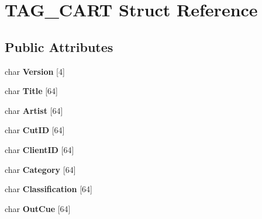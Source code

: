 \hypertarget{structTAG__CART}{}\section{T\+A\+G\+\_\+\+C\+A\+R\+T Struct Reference}
\label{structTAG__CART}
\subsection*{Public Attributes}
\begin{DoxyCompactItemize}
\item 
\hypertarget{structTAG__CART_abc7f41b25d4cac50ddb2e48866536d2b}{}char {\bfseries Version} \mbox{[}4\mbox{]}\label{structTAG__CART_abc7f41b25d4cac50ddb2e48866536d2b}

\item 
\hypertarget{structTAG__CART_aaaeb0e4ce9b4989f0b64104e49c5ba18}{}char {\bfseries Title} \mbox{[}64\mbox{]}\label{structTAG__CART_aaaeb0e4ce9b4989f0b64104e49c5ba18}

\item 
\hypertarget{structTAG__CART_af508180d2adbdc56c2b39d7b52affa05}{}char {\bfseries Artist} \mbox{[}64\mbox{]}\label{structTAG__CART_af508180d2adbdc56c2b39d7b52affa05}

\item 
\hypertarget{structTAG__CART_aad06bfb61f5147031713db4db192c8db}{}char {\bfseries Cut\+I\+D} \mbox{[}64\mbox{]}\label{structTAG__CART_aad06bfb61f5147031713db4db192c8db}

\item 
\hypertarget{structTAG__CART_aa59a44212798fcc99e1a48ebc3ce82c7}{}char {\bfseries Client\+I\+D} \mbox{[}64\mbox{]}\label{structTAG__CART_aa59a44212798fcc99e1a48ebc3ce82c7}

\item 
\hypertarget{structTAG__CART_a34408b2034c6df97558db193c5c66a7e}{}char {\bfseries Category} \mbox{[}64\mbox{]}\label{structTAG__CART_a34408b2034c6df97558db193c5c66a7e}

\item 
\hypertarget{structTAG__CART_a51d1bd046921cd0a6e8a3d4656ec55ad}{}char {\bfseries Classification} \mbox{[}64\mbox{]}\label{structTAG__CART_a51d1bd046921cd0a6e8a3d4656ec55ad}

\item 
\hypertarget{structTAG__CART_ae3977444c552124b0727b46661151af3}{}char {\bfseries Out\+Cue} \mbox{[}64\mbox{]}\label{structTAG__CART_ae3977444c552124b0727b46661151af3}


\end{DoxyCompactItemize}
